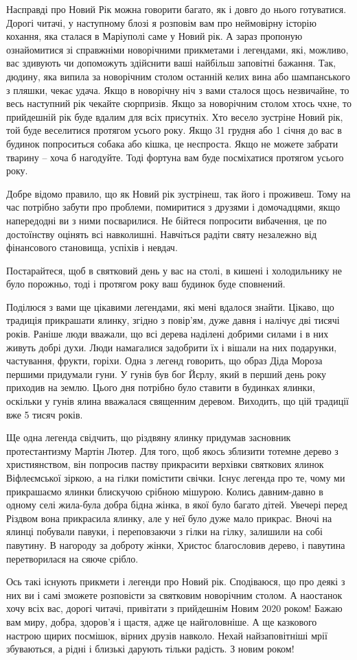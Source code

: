 Насправді про Новий Рік можна говорити багато, як і довго до нього готуватися.
Дорогі читачі, у наступному блозі я розповім вам про неймовірну історію
кохання, яка сталася в Маріуполі саме у Новий рік. А зараз пропоную
ознайомитися зі справжніми новорічними прикметами і легендами, які, можливо,
вас здивують чи допоможуть здійснити ваші найбільш заповітні бажання. Так,
дюдину, яка випила за новорічним столом останній келих вина або шампанського з
пляшки, чекає удача. Якщо в новорічну ніч з вами сталося щось незвичайне, то
весь наступний рік чекайте сюрпризів. Якщо за новорічним столом хтось чхне, то
прийдешній рік буде вдалим для всіх присутніх. Хто весело зустріне Новий рік,
той буде веселитися протягом усього року. Якщо 31 грудня або 1 січня до вас в
будинок попроситься собака або кішка, це неспроста. Якщо не можете забрати
тварину – хоча б нагодуйте. Тоді фортуна вам буде посміхатися протягом усього
року.

Добре відомо правило, що як Новий рік зустрінеш, так його і проживеш. Тому на
час потрібно забути про проблеми, помиритися з друзями і домочадцями, якщо
напередодні ви з ними посварилися. Не бійтеся попросити вибачення, це по
достоїнству оцінять всі навколишні. Навчіться радіти святу незалежно від
фінансового становища, успіхів і невдач.

Постарайтеся, щоб в святковий день у вас на столі, в кишені і холодильнику не
було порожньо, тоді і протягом року ваш будинок буде сповнений.

Поділюся з вами ще цікавими легендами, які мені вдалося знайти. Цікаво, що
традиція прикрашати ялинку, згідно з повір'ям, дуже давня і налічує дві тисячі
років. Раніше люди вважали, що всі дерева наділені добрими силами і в них
живуть добрі духи. Люди намагалися задобрити їх і вішали на них подарунки,
частування, фрукти, горіхи. Одна з легенд говорить, що образ Діда Мороза
першими придумали гуни. У гунів був бог Йєрлу, який в перший день року приходив
на землю. Цього дня потрібно було ставити в будинках ялинки, оскільки у гунів
ялина вважалася священним деревом. Виходить, що цій традиції вже 5 тисяч років.

Ще одна легенда свідчить, що різдвяну ялинку придумав засновник протестантизму
Мартін Лютер. Для того, щоб якось зблизити тотемне дерево з християнством, він
попросив паству прикрасити верхівки святкових ялинок Віфлеємської зіркою, а на
гілки помістити свічки. Існує легенда про те, чому ми прикрашаємо ялинки
блискучою срібною мішурою. Колись давним-давно в одному селі жила-була добра
бідна жінка, в якої було багато дітей. Увечері перед Різдвом вона прикрасила
ялинку, але у неї було дуже мало прикрас. Вночі на ялинці побували павуки, і
переповзаючи з гілки на гілку, залишили на собі павутину. В нагороду за доброту
жінки, Христос благословив дерево, і павутина перетворилася на сяюче срібло.

Ось такі існують прикмети і легенди про Новий рік. Сподіваюся, що про деякі з
них ви і самі зможете розповісти за святковим новорічним столом. А наостанок
хочу всіх вас, дорогі читачі, привітати з прийдешнім Новим 2020 роком! Бажаю
вам миру, добра, здоров'я і щастя, адже це найголовніше. А ще казкового настрою
щирих посмішок, вірних друзів навколо. Нехай найзаповітніші мрії збуваються, а
рідні і близькі дарують тільки радість. З новим роком!
